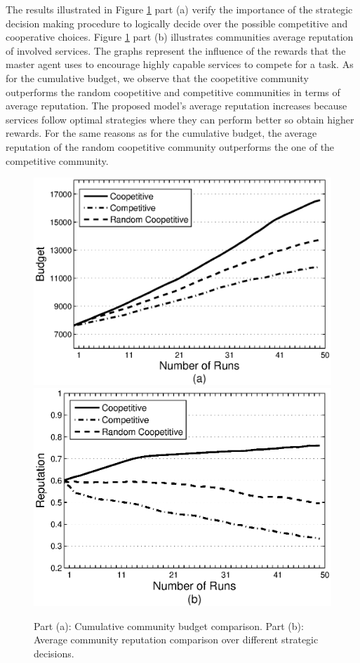 The results illustrated in Figure \ref{Graph1} part (a)  verify
the importance of the strategic decision making procedure to
logically decide over the possible competitive and cooperative
choices. Figure \ref{Graph1} part (b) illustrates communities
average reputation of involved services. The graphs represent the
influence of the rewards that the master agent uses to encourage
highly capable services to compete for a task. As for the
cumulative budget, we observe that the coopetitive community
outperforms the random coopetitive and competitive communities in
terms of average reputation. The proposed model's average
reputation increases because services follow optimal strategies
where they can perform better so obtain higher rewards. For the
same reasons as for the cumulative budget, the average reputation
of the random coopetitive community
outperforms the one of the competitive community. %


\begin{figure}%
\includegraphics[scale=0.55]{Figures/graphbgtmed.eps}
\includegraphics[scale=0.55]{Figures/graphrep.eps}
\caption{Part (a): Cumulative community budget comparison. Part
(b): Average community reputation comparison over different
strategic decisions.} \label{Graph1}
\end{figure}



